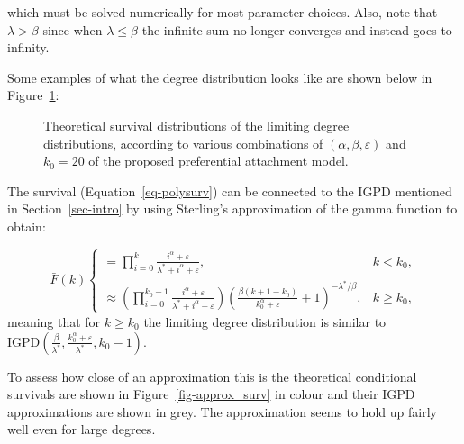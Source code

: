 \documentclass[
  sn-basic,
]{sn-jnl}
\theoremstyle{plain}
\theoremstyle{remark}
\begin{document}
which must be solved numerically for most parameter choices. Also, note
that \(\lambda>\beta\) since when \(\lambda\le \beta\) the infinite sum
no longer converges and instead goes to infinity.

Some examples of what the degree distribution looks like are shown below
in Figure~\ref{fig-polylinsurv}:

\begin{figure}[H]


\caption{\label{fig-polylinsurv}Theoretical survival distributions of
the limiting degree distributions, according to various combinations of
\((\alpha, \beta, \varepsilon)\) and \(k_0=20\) of the proposed
preferential attachment model.}

\end{figure}%

The survival (Equation~\ref{eq-polysurv}) can be connected to the IGPD
mentioned in Section~\ref{sec-intro} by using Sterling's approximation
of the gamma function to obtain:

\[
\bar F(k) 
\begin{cases}
=\prod_{i=0}^{k}\frac{i^\alpha + \varepsilon}{\lambda^*+i^\alpha + \varepsilon},&k<k_0,\\
\approx \left(\prod_{i=0}^{k_0-1}\frac{i^\alpha + \varepsilon}{\lambda^*+i^\alpha + \varepsilon}\right) \left(\frac{\beta(k+1-k_0)}{k_0^{\alpha}+\varepsilon} + 1\right)^{-\lambda^*/\beta},&k\ge k_0,
\end{cases}
\] meaning that for \(k\ge k_0\) the limiting degree distribution is
similar to
\(\text{IGPD}\left(\frac{\beta}{\lambda^*}, \frac{k_0^\alpha + \varepsilon}{\lambda^*},k_0-1\right)\).

To assess how close of an approximation this is the theoretical
conditional survivals are shown in Figure~\ref{fig-approx_surv} in
colour and their IGPD approximations are shown in grey. The
approximation seems to hold up fairly well even for large degrees.
\end{document}
